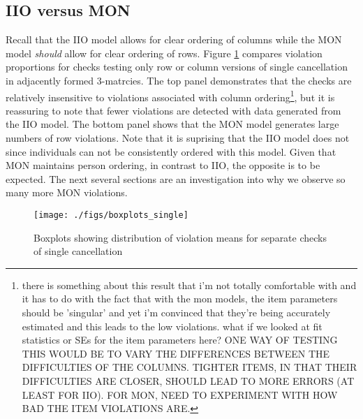 \documentclass[12pt]{article}
\begin{document}
\subsection{IIO versus MON} \label{iio_mon}
Recall that the IIO model allows for clear ordering of columns while the MON model {\em should} allow for clear ordering of rows. Figure \ref{boxplots_single} compares violation proportions for checks testing only row or column versions of single cancellation in adjacently formed 3-matrcies. The top panel demonstrates that the checks are relatively insensitive to violations associated with column ordering\footnote{there is something about this result that i'm not totally comfortable with and it has to do with the fact that with the mon models, the item parameters should be 'singular' and yet i'm convinced that they're being accurately estimated and this leads to the low violations. what if we looked at fit statistics or SEs for the item parameters here?
ONE WAY OF TESTING THIS WOULD BE TO VARY THE DIFFERENCES BETWEEN THE DIFFICULTIES OF THE COLUMNS. TIGHTER ITEMS, IN THAT THEIR DIFFICULTIES ARE CLOSER, SHOULD LEAD TO MORE ERRORS (AT LEAST FOR IIO). FOR MON, NEED TO EXPERIMENT WITH HOW BAD THE ITEM VIOLATIONS ARE.}, but it is reassuring to note that fewer violations are detected with data generated from the IIO model. The bottom panel shows that the MON model generates large numbers of row violations. Note that it is suprising that the IIO model does not since individuals can not be consistently ordered with this model.  Given that MON maintains person ordering, in contrast to IIO, the opposite is to be expected. The next several sections are an investigation into why we observe so many more MON violations. 

\begin{figure}
\centering
\caption{Boxplots showing distribution of violation means for  separate checks of single cancellation} \label{boxplots_single}
\texttt{[image: ./figs/boxplots\_single]}
\end{figure}
\end{document}
